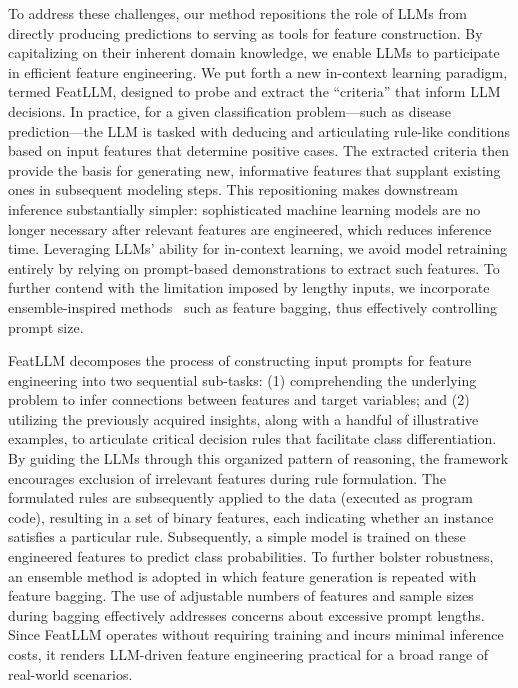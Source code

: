 To address these challenges, our method repositions the role of LLMs from directly producing predictions to serving as tools for feature construction. By capitalizing on their inherent domain knowledge, we enable LLMs to participate in efficient feature engineering. We put forth a new in-context learning paradigm, termed \textsf{FeatLLM}, designed to probe and extract the “criteria” that inform LLM decisions. In practice, for a given classification problem—such as disease prediction—the LLM is tasked with deducing and articulating rule-like conditions based on input features that determine positive cases. The extracted criteria then provide the basis for generating new, informative features that supplant existing ones in subsequent modeling steps. This repositioning makes downstream inference substantially simpler: sophisticated machine learning models are no longer necessary after relevant features are engineered, which reduces inference time. Leveraging LLMs’ ability for in-context learning, we avoid model retraining entirely by relying on prompt-based demonstrations to extract such features. To further contend with the limitation imposed by lengthy inputs, we incorporate ensemble-inspired methods~\cite{breiman2001random} such as feature bagging, thus effectively controlling prompt size.

\textsf{FeatLLM} decomposes the process of constructing input prompts for feature engineering into two sequential sub-tasks: (1) comprehending the underlying problem to infer connections between features and target variables; and (2) utilizing the previously acquired insights, along with a handful of illustrative examples, to articulate critical decision rules that facilitate class differentiation. By guiding the LLMs through this organized pattern of reasoning, the framework encourages exclusion of irrelevant features during rule formulation. The formulated rules are subsequently applied to the data (executed as program code), resulting in a set of binary features, each indicating whether an instance satisfies a particular rule. Subsequently, a simple model is trained on these engineered features to predict class probabilities. To further bolster robustness, an ensemble method is adopted in which feature generation is repeated with feature bagging. The use of adjustable numbers of features and sample sizes during bagging effectively addresses concerns about excessive prompt lengths. Since \textsf{FeatLLM} operates without requiring training and incurs minimal inference costs, it renders LLM-driven feature engineering practical for a broad range of real-world scenarios.

